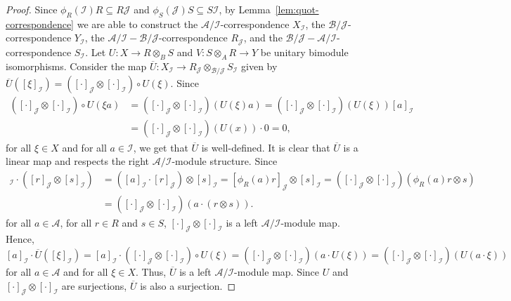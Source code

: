 \documentclass[11pt, letterpaper,final]{amsart}
\newcommand{\A}{{\mathcal{A}}}
\newcommand{\B}{{\mathcal{B}}}
\newcommand{\I}{{\mathcal{I}}}
\newcommand{\J}{{\mathcal{J}}}
\theoremstyle{definition}
\begin{document}
\begin{proof}
Since $\phi_R(\I)R \subseteq R\J$ and $\phi_S(\J) S \subseteq S\I$, by Lemma~\ref{lem:quot-correspondence} we are able to construct the $\A/\I$-correspondence $X_{\I}$, the $\B/\J$-correspondence $Y_{\I}$, the $\A/\I-\B/\J$-correspondence $R_{\J}$, and the $\B/\J-\A/\I$-correspondence $S_{\I}$.  Let $U \colon X \to R \otimes_B S$ and $V \colon S \otimes_A R \to Y$ be unitary bimodule isomorphisms. Consider the map $\overline{U} \colon X_{\I} \to R_{\J} \otimes_{\B/\J} S_{\I}$ given by $\overline{U} ( [\xi]_{\I}) = ([\cdot]_{\J} \otimes [\cdot]_{\I}) \circ U(\xi)$. Since 
\begin{align*}
([\cdot]_{\J} \otimes [\cdot]_{\I}) \circ U(\xi a) &=([\cdot]_{\J} \otimes [\cdot]_{\I}) ( U(\xi) a) = ([\cdot]_{\J} \otimes [\cdot]_{\I})( U(\xi)) [a]_{\I}\\
&= ([\cdot]_{\J} \otimes [\cdot]_{\I})( U(x)) \cdot 0=0,
\end{align*}
for all $\xi \in X$ and for all $a \in \I$, we get that $\overline{U}$ is well-defined. It is clear that $\overline{U}$ is a linear map and respects the right $\A/\I$-module structure. Since
\begin{align*}
[a]_{\I} \cdot ( [r]_{\J} \otimes [s]_{\I}) &= ( [a]_{\I} \cdot [r]_{\J} ) \otimes [s]_{\I}= [\phi_R(a)r]_{\J} \otimes [s]_{\I} = ([\cdot]_{\J} \otimes [\cdot]_{\I})( \phi_R(a) r \otimes s) \\
&= ([\cdot]_{\J} \otimes [\cdot]_{\I})( a \cdot ( r \otimes s) ). 
\end{align*}
for all $a \in \A$, for all $r \in R$ and $s \in S$, $[\cdot]_{\J} \otimes [\cdot]_{\I}$ is a left $\A/\I$-module map. Hence,
\[
[a]_{\I} \cdot \overline{U}( [\xi]_{\I}) = [a]_{\I} \cdot ([\cdot]_{\J} \otimes [\cdot]_{\I}) \circ U(\xi) = ([\cdot]_{\J} \otimes [\cdot]_{\I}) ( a \cdot U(\xi)) = ([\cdot]_{\J} \otimes [\cdot]_{\I}) ( U( a\cdot \xi))
\]
for all $a \in \A$ and for all $\xi \in X$.  Thus, $\overline{U}$ is a left $\A/\I$-module map. Since $U$ and $[\cdot]_{\J} \otimes [\cdot]_{\I}$ are surjections, $\overline{U}$ is also a surjection.


\end{proof}
\end{document}
